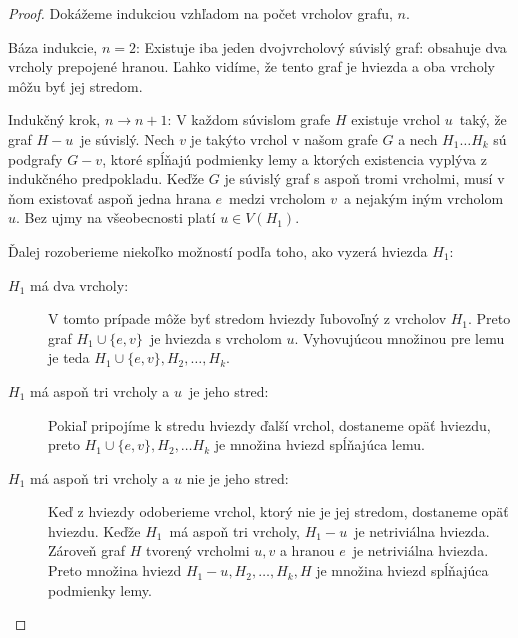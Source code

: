 \begin{proof}
    Dokážeme indukciou vzhľadom na počet vrcholov grafu, $n$.

    Báza indukcie, $n = 2$: Existuje iba jeden dvojvrcholový súvislý
    graf: obsahuje dva vrcholy prepojené hranou. Ľahko vidíme, že tento graf je hviezda a oba vrcholy
    môžu byť jej stredom.

    Indukčný krok, $n \to n+1$: V každom súvislom grafe $H$ existuje vrchol $u$ taký, že graf $H - u$ je súvislý.
    Nech $v$ je takýto vrchol v našom grafe $G$ a nech $H_1 \ldots H_k$ sú podgrafy $G-v$, ktoré spĺňajú
    podmienky lemy a ktorých existencia vyplýva z indukčného predpokladu. Keďže $G$ je súvislý graf s aspoň
    tromi vrcholmi, musí v ňom existovať aspoň jedna hrana $e$ medzi vrcholom $v$ a nejakým iným vrcholom $u$.
    Bez ujmy na všeobecnosti platí $u \in V(H_1)$.

    Ďalej rozoberieme niekoľko možností podľa toho, ako vyzerá hviezda $H_1$:

    \begin{description}
        \item[$H_1$ má dva vrcholy:] V tomto prípade môže byť stredom hviezdy ľubovoľný z vrcholov $H_1$.
        Preto graf $H_1 \cup \{e, v\}$ je hviezda s vrcholom $u$. Vyhovujúcou množinou pre lemu je teda
        $H_1 \cup \{e, v\}, H_2, \ldots, H_k$.
        \item[$H_1$ má aspoň tri vrcholy a $u$ je jeho stred:] Pokiaľ pripojíme k stredu hviezdy ďalší
        vrchol, dostaneme opäť hviezdu, preto $H_1 \cup \{e, v\}, H_2, \ldots H_k$ je množina hviezd
        spĺňajúca lemu.
        \item[$H_1$ má aspoň tri vrcholy a $u$ nie je jeho stred:] Keď z hviezdy odoberieme vrchol, ktorý
        nie je jej stredom, dostaneme opäť hviezdu. Keďže $H_1$ má aspoň tri vrcholy, $H_1 - u$ je netriviálna
        hviezda. Zároveň graf $H$ tvorený vrcholmi $u, v$ a hranou $e$ je netriviálna hviezda. Preto množina
        hviezd $H_1 - u, H_2, \ldots, H_k, H$ je množina hviezd spĺňajúca podmienky lemy.
    \end{description}
\end{proof}
